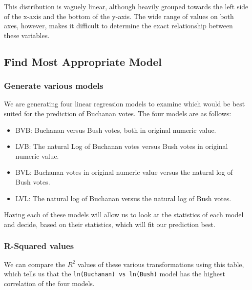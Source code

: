 \documentclass[
  letterpaper,
  DIV=11,
  numbers=noendperiod]{scrartcl}
\providecommand{\tightlist}{%
  \setlength{\itemsep}{0pt}\setlength{\parskip}{0pt}}\usepackage{longtable,booktabs,array}
\begin{document}
This distribution is vaguely linear, although heavily grouped towards
the left side of the x-axis and the bottom of the y-axis. The wide range
of values on both axes, however, makes it difficult to determine the
exact relationship between these variables.

\hypertarget{find-most-appropriate-model}{%
\subsection{Find Most Appropriate
Model}\label{find-most-appropriate-model}}

\hypertarget{generate-various-models}{%
\subsubsection{Generate various models}\label{generate-various-models}}

We are generating four linear regression models to examine which would
be best suited for the prediction of Buchanan votes. The four models are
as follows:

\begin{itemize}
\tightlist
\item
  BVB: Buchanan versus Bush votes, both in original numeric value.
\item
  LVB: The natural Log of Buchanan votes versus Bush votes in original
  numeric value.
\item
  BVL: Buchanan votes in original numeric value versus the natural log
  of Bush votes.
\item
  LVL: The natural log of Buchanan versus the natural log of Bush votes.
\end{itemize}

Having each of these models will allow us to look at the statistics of
each model and decide, based on their statistics, which will fit our
prediction best.

\hypertarget{r-squared-values}{%
\subsubsection{R-Squared values}\label{r-squared-values}}

We can compare the \(R^2\) values of these various transformations using
this table, which tells us that the \texttt{ln(Buchanan)\ vs\ ln(Bush)}
model has the highest correlation of the four models.
\end{document}
